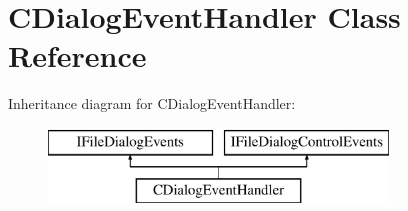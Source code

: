 \hypertarget{class_c_dialog_event_handler}{\section{C\-Dialog\-Event\-Handler Class Reference}
\label{class_c_dialog_event_handler}
}
Inheritance diagram for C\-Dialog\-Event\-Handler\-:\begin{figure}[H]
\begin{center}
\leavevmode
\includegraphics[height=2.000000cm]{class_c_dialog_event_handler}
\end{center}
\end{figure}
